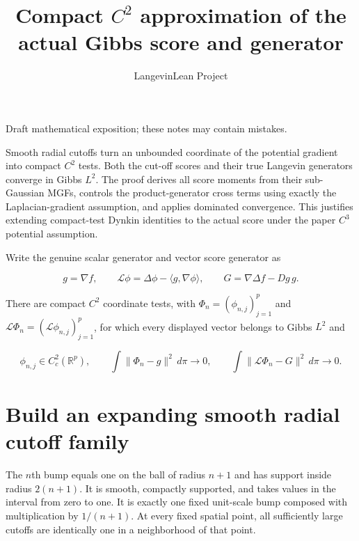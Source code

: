 \documentclass[11pt,a4paper]{article}
\title{\texorpdfstring{Compact \(C^{2}\) approximation of the actual Gibbs score and generator}{Compact C² approximation of the actual Gibbs score and generator}}
\author{LangevinLean Project}
\date{}
\begin{document}
\maketitle
Draft mathematical exposition; these notes may contain mistakes.


Smooth radial cutoffs turn an unbounded coordinate of the potential gradient into compact \(C^{2}\) tests. Both the cut-off scores and their true Langevin generators converge in Gibbs \(L^{2}\). The proof derives all score moments from their sub-Gaussian MGFs, controls the product-generator cross terms using exactly the Laplacian-gradient assumption, and applies dominated convergence. This justifies extending compact-test Dynkin identities to the actual score under the paper \(C^{3}\) potential assumption.



Write the genuine scalar generator and vector score generator as

\[g=\nabla f,\qquad \mathcal L\phi=\Delta\phi-\langle g,\nabla\phi\rangle,\qquad G=\nabla\Delta f-Dg\,g.\]

There are compact \(C^{2}\) coordinate tests, with \(\Phi_n=(\phi_{n,j})_{j=1}^p\) and \(\mathcal L\Phi_n=(\mathcal L\phi_{n,j})_{j=1}^p\), for which every displayed vector belongs to Gibbs \(L^{2}\) and

\[\phi_{n,j}\in C_c^2(\mathbb R^p),\qquad \int\!\|\Phi_n-g\|^2\,d\pi\longrightarrow0,\qquad \int\!\|\mathcal L\Phi_n-G\|^2\,d\pi\longrightarrow0.\]
\section{\texorpdfstring{Build an expanding smooth radial cutoff family}{Build an expanding smooth radial cutoff family}}


The \(n\)th bump equals one on the ball of radius \(n+1\) and has support inside radius \(2(n+1)\). It is smooth, compactly supported, and takes values in the interval from zero to one. It is exactly one fixed unit-scale bump composed with multiplication by \(1/(n+1)\). At every fixed spatial point, all sufficiently large cutoffs are identically one in a neighborhood of that point.
\end{document}
